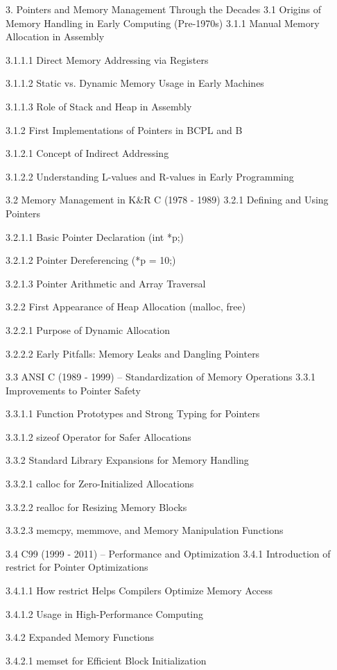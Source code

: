 3. Pointers and Memory Management Through the Decades
3.1 Origins of Memory Handling in Early Computing (Pre-1970s)
3.1.1 Manual Memory Allocation in Assembly

3.1.1.1 Direct Memory Addressing via Registers

3.1.1.2 Static vs. Dynamic Memory Usage in Early Machines

3.1.1.3 Role of Stack and Heap in Assembly

3.1.2 First Implementations of Pointers in BCPL and B

3.1.2.1 Concept of Indirect Addressing

3.1.2.2 Understanding L-values and R-values in Early Programming

3.2 Memory Management in K&R C (1978 - 1989)
3.2.1 Defining and Using Pointers

3.2.1.1 Basic Pointer Declaration (int *p;)

3.2.1.2 Pointer Dereferencing (*p = 10;)

3.2.1.3 Pointer Arithmetic and Array Traversal

3.2.2 First Appearance of Heap Allocation (malloc, free)

3.2.2.1 Purpose of Dynamic Allocation

3.2.2.2 Early Pitfalls: Memory Leaks and Dangling Pointers

3.3 ANSI C (1989 - 1999) – Standardization of Memory Operations
3.3.1 Improvements to Pointer Safety

3.3.1.1 Function Prototypes and Strong Typing for Pointers

3.3.1.2 sizeof Operator for Safer Allocations

3.3.2 Standard Library Expansions for Memory Handling

3.3.2.1 calloc for Zero-Initialized Allocations

3.3.2.2 realloc for Resizing Memory Blocks

3.3.2.3 memcpy, memmove, and Memory Manipulation Functions

3.4 C99 (1999 - 2011) – Performance and Optimization
3.4.1 Introduction of restrict for Pointer Optimizations

3.4.1.1 How restrict Helps Compilers Optimize Memory Access

3.4.1.2 Usage in High-Performance Computing

3.4.2 Expanded Memory Functions

3.4.2.1 memset for Efficient Block Initialization

